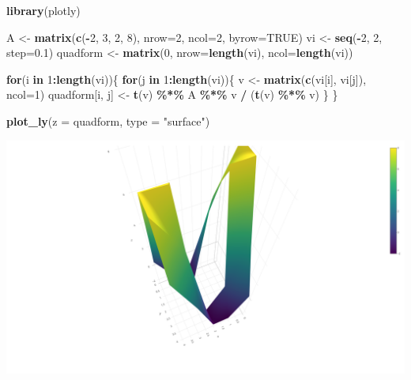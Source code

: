 \documentclass[
]{book}
\newenvironment{Shaded}{\begin{snugshade}}{\end{snugshade}}
\newcommand{\ControlFlowTok}[1]{\textcolor[rgb]{0.13,0.29,0.53}{\textbf{#1}}}
\newcommand{\DataTypeTok}[1]{\textcolor[rgb]{0.13,0.29,0.53}{#1}}
\newcommand{\DecValTok}[1]{\textcolor[rgb]{0.00,0.00,0.81}{#1}}
\newcommand{\FloatTok}[1]{\textcolor[rgb]{0.00,0.00,0.81}{#1}}
\newcommand{\KeywordTok}[1]{\textcolor[rgb]{0.13,0.29,0.53}{\textbf{#1}}}
\newcommand{\NormalTok}[1]{#1}
\newcommand{\OperatorTok}[1]{\textcolor[rgb]{0.81,0.36,0.00}{\textbf{#1}}}
\newcommand{\OtherTok}[1]{\textcolor[rgb]{0.56,0.35,0.01}{#1}}
\newcommand{\StringTok}[1]{\textcolor[rgb]{0.31,0.60,0.02}{#1}}
\begin{document}
\begin{Shaded}
\begin{Highlighting}[]
\KeywordTok{library}\NormalTok{(plotly)}

\NormalTok{A \textless{}{-}}\StringTok{ }\KeywordTok{matrix}\NormalTok{(}\KeywordTok{c}\NormalTok{(}\OperatorTok{{-}}\DecValTok{2}\NormalTok{, }\DecValTok{3}\NormalTok{, }\DecValTok{2}\NormalTok{, }\DecValTok{8}\NormalTok{), }\DataTypeTok{nrow=}\DecValTok{2}\NormalTok{, }\DataTypeTok{ncol=}\DecValTok{2}\NormalTok{, }\DataTypeTok{byrow=}\OtherTok{TRUE}\NormalTok{)}
\NormalTok{vi \textless{}{-}}\StringTok{ }\KeywordTok{seq}\NormalTok{(}\OperatorTok{{-}}\DecValTok{2}\NormalTok{, }\DecValTok{2}\NormalTok{, }\DataTypeTok{step=}\FloatTok{0.1}\NormalTok{)}
\NormalTok{quadform \textless{}{-}}\StringTok{ }\KeywordTok{matrix}\NormalTok{(}\DecValTok{0}\NormalTok{, }\DataTypeTok{nrow=}\KeywordTok{length}\NormalTok{(vi), }\DataTypeTok{ncol=}\KeywordTok{length}\NormalTok{(vi))}

\ControlFlowTok{for}\NormalTok{(i }\ControlFlowTok{in} \DecValTok{1}\OperatorTok{:}\KeywordTok{length}\NormalTok{(vi))\{}
  \ControlFlowTok{for}\NormalTok{(j }\ControlFlowTok{in} \DecValTok{1}\OperatorTok{:}\KeywordTok{length}\NormalTok{(vi))\{}
\NormalTok{    v \textless{}{-}}\StringTok{ }\KeywordTok{matrix}\NormalTok{(}\KeywordTok{c}\NormalTok{(vi[i], vi[j]), }\DataTypeTok{ncol=}\DecValTok{1}\NormalTok{)}
\NormalTok{    quadform[i, j] \textless{}{-}}\StringTok{ }\KeywordTok{t}\NormalTok{(v) }\OperatorTok{\%*\%}\StringTok{ }\NormalTok{A }\OperatorTok{\%*\%}\StringTok{ }\NormalTok{v }\OperatorTok{/}\StringTok{ }\NormalTok{(}\KeywordTok{t}\NormalTok{(v) }\OperatorTok{\%*\%}\StringTok{ }\NormalTok{v)}
\NormalTok{  \}}
\NormalTok{\}}
  
\KeywordTok{plot\_ly}\NormalTok{(}\DataTypeTok{z =}\NormalTok{ quadform, }\DataTypeTok{type =} \StringTok{"surface"}\NormalTok{)}
\end{Highlighting}
\end{Shaded}

\includegraphics[width=26.39in]{images/e17-1}
\end{document}

